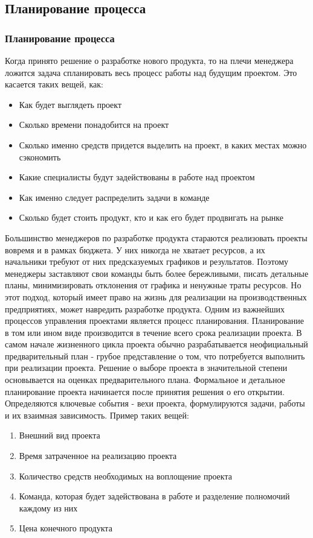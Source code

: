 \documentclass{../industrial-development}
\begin{document}
\subsection{Планирование процесса}
\begin{frame} \frametitle{Планирование процесса}
Когда принято решение о разработке нового продукта, то на плечи менеджера ложится задача спланировать весь процесс работы над будущим проектом. Это касается таких вещей, как:
\begin{itemize}	
		\item Как будет выглядеть проект
		\item Сколько времени понадобится на проект
	 	\item Сколько именно средств придется выделить на проект, в каких местах можно сэкономить
	 	\item Какие специалисты будут задействованы в работе над проектом
		\item Как именно следует распределить задачи в команде
	 	\item Сколько будет стоить продукт, кто и как его будет продвигать на рынке

 \end{itemize}
\end{frame}
\lecturenotes
Большинство менеджеров по разработке продукта стараются реализовать проекты вовремя и в рамках бюджета. У них никогда не хватает ресурсов, а их начальники требуют от них предсказуемых графиков и результатов. Поэтому менеджеры заставляют свои команды быть более бережливыми, писать детальные планы, минимизировать отклонения от графика и ненужные траты ресурсов. Но этот подход, который имеет право на жизнь для реализации на производственных предприятиях, может навредить разработке продукта. 
Одним из важнейших процессов управления проектами является процесс планирования. Планирование в том или ином виде производится в течение всего срока реализации проекта. В самом начале жизненного цикла проекта обычно разрабатывается неофициальный предварительный план - грубое представление о том, что потребуется выполнить при реализации проекта. Решение о выборе проекта в значительной степени основывается на оценках предварительного плана. Формальное и детальное планирование проекта начинается после принятия решения о его открытии. Определяются ключевые события - вехи проекта, формулируются задачи, работы и их взаимная зависимость. Пример таких вещей: 
\begin{enumerate} 
\item Внешний вид проекта 
\item Время затраченное на реализацию проекта 
\item Количество средств необходимых на воплощение проекта 
\item Команда, которая будет задействована в работе и разделение полномочий каждому из них 
\item Цена конечного продукта 
\end{enumerate}
\end{document}
